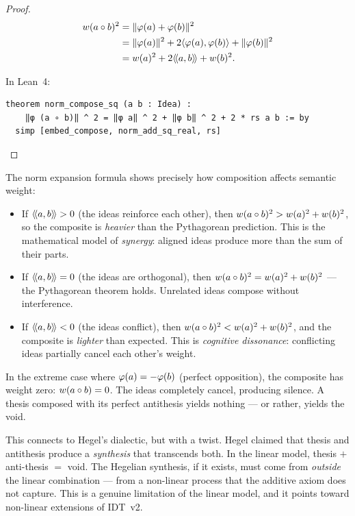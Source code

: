 \begin{proof}
\begin{align*}
  w(a \circ b)^2
  &= \lVert \varphi(a) + \varphi(b) \rVert^2 \\
  &= \lVert \varphi(a) \rVert^2 + 2\langle \varphi(a), \varphi(b) \rangle + \lVert \varphi(b) \rVert^2 \\
  &= w(a)^2 + 2\langle\!\langle a, b \rangle\!\rangle + w(b)^2.
\end{align*}

In Lean~4:
\begin{lstlisting}
theorem norm_compose_sq (a b : Idea) :
    ‖φ (a ∘ b)‖ ^ 2 = ‖φ a‖ ^ 2 + ‖φ b‖ ^ 2 + 2 * rs a b := by
  simp [embed_compose, norm_add_sq_real, rs]
\end{lstlisting}
\end{proof}

\begin{interpretation}
\label{interp:reinforcement}
The norm expansion formula shows precisely how composition affects semantic
weight:
\begin{itemize}
\item If $\langle\!\langle a, b \rangle\!\rangle > 0$ (the ideas reinforce each other), then $w(a \circ
b)^2 > w(a)^2 + w(b)^2$, so the composite is \emph{heavier} than the
Pythagorean prediction. This is the mathematical model of \emph{synergy}:
aligned ideas produce more than the sum of their parts.

\item If $\langle\!\langle a, b \rangle\!\rangle = 0$ (the ideas are orthogonal), then $w(a \circ b)^2 =
w(a)^2 + w(b)^2$ --- the Pythagorean theorem holds. Unrelated ideas compose
without interference.

\item If $\langle\!\langle a, b \rangle\!\rangle < 0$ (the ideas conflict), then $w(a \circ b)^2 <
w(a)^2 + w(b)^2$, and the composite is \emph{lighter} than expected. This is
\emph{cognitive dissonance}: conflicting ideas partially cancel each other's
weight.
\end{itemize}
In the extreme case where $\varphi(a) = -\varphi(b)$ (perfect opposition), the
composite has weight zero: $w(a \circ b) = 0$. The ideas completely cancel,
producing silence. A thesis composed with its perfect antithesis yields nothing
--- or rather, yields the void.

This connects to Hegel's dialectic, but with a twist. Hegel claimed that
thesis and antithesis produce a \emph{synthesis} that transcends both. In the
linear model, thesis $+$ anti-thesis $=$ void. The Hegelian synthesis, if it
exists, must come from \emph{outside} the linear combination --- from a
non-linear process that the additive axiom does not capture. This is a
genuine limitation of the linear model, and it points toward non-linear
extensions of IDT~v2.
\end{interpretation}


